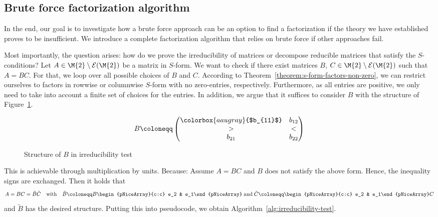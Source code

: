 \subsection{Brute force factorization algorithm}

In the end, our goal is to investigate how a brute force approach can be an option to find a factorization if the theory we have established proves to be insufficient. We introduce a complete factorization algorithm that relies on brute force if other approaches fail.

Most importantly, the question arises: how do we prove the irreducibility of matrices or decompose reducible matrices that satisfy the $S$-conditions? Let $A \in \M{2}\setminus\mathcal{E}(\M{2})$ be a matrix in $S$-form. We want to check if there exist matrices $B$, $C \in  \M{2}\setminus\mathcal{E}(\M{2})$ such that $A = BC$. For that, we loop over all possible choices of $B$ and $C$. According to Theorem~\ref{theorem:s-form-factors-non-zero}, we can restrict ourselves to factors in rowwise or columnwise $S$-form with no zero-entries, respectively. Furthermore, as all entries are positive, we only need to take into account a finite set of choices for the entries. In addition, we argue that it suffices to consider $B$ with the structure of Figure~\ref{fig:structure-b}.

\begin{figure}[htbp]
\[ B \coloneqq \begin{pmatrix} \colorbox{aaugray}{$b_{11}$} & b_{12} \\ > & < \\ b_{21} & b_{22} \end{pmatrix} \]
\caption{Structure of $B$ in irreducibility test}\label{fig:structure-b}
\end{figure}

This is achievable through multiplication by units. Because: Assume $A=BC$ and $B$ does not satisfy the above form. Hence, the inequality signs are exchanged. Then it holds that
\[ A = BC = \tilde{B}\tilde{C} \quad \text{with} \quad \tilde{B} \coloneqq B\begin{pNiceArray}{c:c} e_2 & e_1\end{pNiceArray}\;\text{and}\;\tilde{C} \coloneqq \begin{pNiceArray}{c:c} e_2 & e_1\end{pNiceArray}C \]
and $\tilde{B}$ has the desired structure. Putting this into pseudocode, we obtain Algorithm~\ref{alg:irreducibility-test}.

